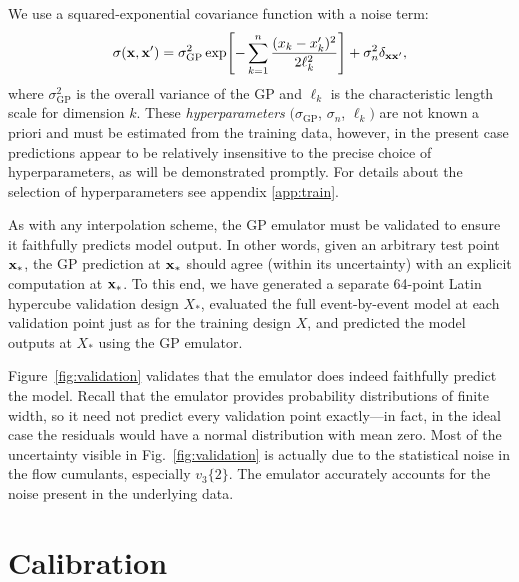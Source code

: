 \documentclass[aps,prc,reprint,superscriptaddress,amsmath]{revtex4-1}
\newcommand{\vnk}[2]{v_#1\{#2\}}
\begin{document}
We use a squared-exponential covariance function with a noise term:
\begin{equation}
  \sigma(\mathbf x, \mathbf x') = \sigma_\text{GP}^2 \exp\Biggl[ -\sum_{k=1}^n \frac{(x_k - x'_k)^2}{2\ell_k^2} \Biggr] + \sigma_n^2\delta_{\mathbf x\mathbf x'},
  \label{eq:full_cov}
\end{equation}
where $\sigma_\text{GP}^2$ is the overall variance of the GP and $\ell_k$ is the characteristic length scale for dimension $k$.
These \emph{hyperparameters} $(\sigma_\text{GP}$, $\sigma_n$, $\ell_k)$ are not known a priori and must be estimated from the training data, however, in the present case predictions appear to be relatively insensitive to the precise choice of hyperparameters, as will be demonstrated promptly.
For details about the selection of hyperparameters see appendix \ref{app:train}.

As with any interpolation scheme, the GP emulator must be validated to ensure it faithfully predicts model output.
In other words, given an arbitrary test point $\mathbf x_*$, the GP prediction at $\mathbf x_*$ should agree (within its uncertainty) with an explicit computation at $\mathbf x_*$.
To this end, we have generated a separate 64-point Latin hypercube validation design $X_*$, evaluated the full event-by-event model at each validation point just as for the training design $X$, and predicted the model outputs at $X_*$ using the GP emulator.

Figure~\ref{fig:validation} validates that the emulator does indeed faithfully predict the model.
Recall that the emulator provides probability distributions of finite width, so it need not predict every validation point exactly---in fact, in the ideal case the residuals would have a normal distribution with mean zero.
Most of the uncertainty visible in Fig.~\ref{fig:validation} is actually due to the statistical noise in the flow cumulants, especially $\vnk 3 2$.
The emulator accurately accounts for the noise present in the underlying data.


\section{Calibration}

\newcommand{\z}{\mathbf z}
\newcommand{\xs}{\x_\star}
\newcommand{\zs}{\z_\star}
\newcommand{\yexp}{\y_\text{exp}}
\newcommand{\zexp}{\z_\text{exp}}
\end{document}
